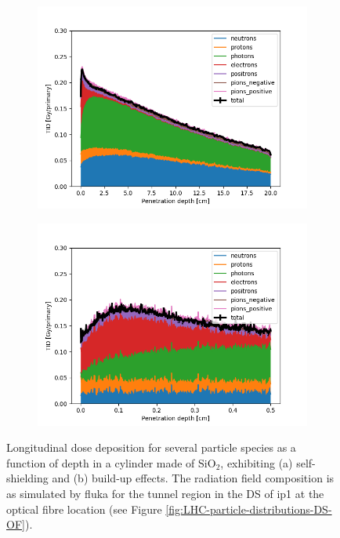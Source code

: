 \documentclass[encoding=utf8,british]{tumphthesis}
\begin{document}
\begin{figure}[H]
\centering
\begin{subfigure}{.5\textwidth}
  \centering
  \includegraphics[width=\columnwidth]{results/mixed_spectrum_OF_shielded_20cm.png}
  \label{fig:self-shielding}
\end{subfigure}%
\begin{subfigure}{.5\textwidth}
  \centering
  \includegraphics[width=\columnwidth]{results/mixed_spectrum_OF_shielded_05cm.png}
  \label{fig:build-up}
\end{subfigure}
\caption{Longitudinal dose deposition for several particle species as a function of depth in a cylinder made of SiO$_2$, exhibiting (a) self-shielding and (b) build-up effects. The radiation field composition is as simulated by \acrshort{fluka} for the tunnel region in the DS of \acrshort{ip}1 at the optical fibre location (see Figure \ref{fig:LHC-particle-distributions-DS-OF}).}
\label{fig:stopping-power-particle-species}
\end{figure}
\end{document}
